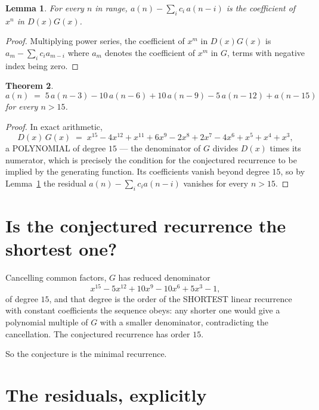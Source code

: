 \documentclass[11pt,a4paper]{article}
\theoremstyle{plain}
\newtheorem{theorem}{Theorem}
\newtheorem{lemma}[theorem]{Lemma}
\theoremstyle{definition}
\begin{document}
\begin{lemma}\label{lem:key}
For every $n$ in range, $a(n)-\sum_i c_i\,a(n-i)$ is the coefficient of $x^{n}$ in
$D(x)G(x)$.
\end{lemma}

\begin{proof}
Multiplying power series, the coefficient of $x^{m}$ in $D(x)G(x)$ is
$a_m-\sum_i c_i a_{m-i}$ where $a_m$ denotes the coefficient of $x^{m}$ in $G$, terms with
negative index being zero.
\end{proof}

\begin{theorem}
\[
a(n)\;=\;5\,a(n-3) - 10\,a(n-6) + 10\,a(n-9) - 5\,a(n-12) + a(n-15)
\]
for every $n>15$.
\end{theorem}

\begin{proof}
In exact arithmetic,
\[
D(x)\,G(x)\;=\;x^{15} - 4 x^{12} + x^{11} + 6 x^{9} - 2 x^{8} + 2 x^{7} - 4 x^{6} + x^{5} + x^{4} + x^{3},
\]
a POLYNOMIAL of degree $15$ --- the denominator of $G$ divides $D(x)$ times its numerator,
which is precisely the condition for the conjectured recurrence to be implied by the
generating function. Its coefficients vanish beyond degree $15$, so by
Lemma~\ref{lem:key} the residual $a(n)-\sum_ic_ia(n-i)$ vanishes for every
$n>15$.
\end{proof}

\section{Is the conjectured recurrence the shortest one?}

Cancelling common factors, $G$ has reduced denominator
\[
x^{15} - 5 x^{12} + 10 x^{9} - 10 x^{6} + 5 x^{3} - 1,
\]
of degree $15$, and that degree is the order of the SHORTEST linear recurrence with
constant coefficients the sequence obeys: any shorter one would give a polynomial multiple of
$G$ with a smaller denominator, contradicting the cancellation. The conjectured recurrence has
order $15$.

So the conjecture is the minimal recurrence.

\section{The residuals, explicitly}
\end{document}
